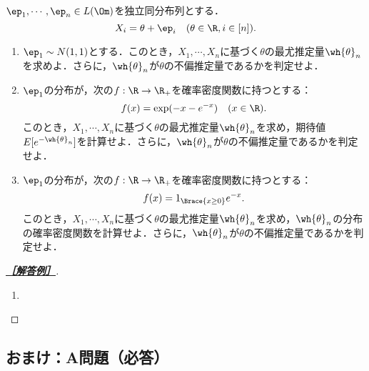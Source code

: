 \documentclass[uplatex,dvipdfmx]{jsarticle}
\begin{document}
\begin{tcolorbox}[colframe=ForestGreen, colback=ForestGreen!10!white,breakable,colbacktitle=ForestGreen!40!white,coltitle=black,fonttitle=\bfseries\sffamily,
    title=B 第17問（数理統計学）]
    $\ep_1,\cdots,\ep_n\in L(\Om)$を独立同分布列とする．
    \[X_i=\theta+\ep_i\quad(\theta\in\R,i\in[n]).\]
    \begin{enumerate}
        \item $\ep_1\sim N(1,1)$とする．このとき，$X_1,\cdots,X_n$に基づく$\theta$の最尤推定量$\wh{\theta}_n$を求めよ．さらに，$\wh{\theta}_n$が$\theta$の不偏推定量であるかを判定せよ．
        \item $\ep_1$の分布が，次の$f:\R\to\R_+$を確率密度関数に持つとする：
        \[f(x)=\exp(-x-e^{-x})\quad(x\in\R).\]
        このとき，$X_1,\cdots,X_n$に基づく$\theta$の最尤推定量$\wh{\theta}_n$を求め，期待値$E[e^{-\wh{\theta}_n}]$を計算せよ．さらに，$\wh{\theta}_n$が$\theta$の不偏推定量であるかを判定せよ．
        \item $\ep_1$の分布が，次の$f:\R\to\R_+$を確率密度関数に持つとする：
        \[f(x)=1_{\Brace{x\ge0}}e^{-x}.\]
        このとき，$X_1,\cdots,X_n$に基づく$\theta$の最尤推定量$\wh{\theta}_n$を求め，$\wh{\theta}_n$の分布の確率密度関数を計算せよ．さらに，$\wh{\theta}_n$が$\theta$の不偏推定量であるかを判定せよ．
    \end{enumerate}
\end{tcolorbox}
\begin{proof}[\textbf{\underline{［解答例］}}]\mbox{}
    \begin{enumerate}
        \item 
    \end{enumerate}
\end{proof}

\subsection{おまけ：A問題（必答）}
\end{document}

